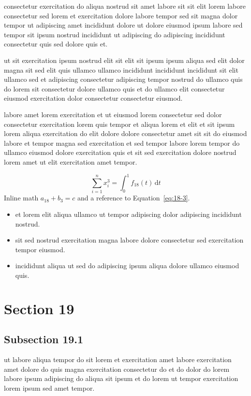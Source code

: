 \documentclass{article}
\begin{document}
consectetur exercitation do aliqua nostrud sit amet labore sit sit elit lorem labore consectetur sed lorem et exercitation dolore labore tempor sed sit magna dolor tempor ut adipiscing amet incididunt dolore ut dolore eiusmod ipsum labore sed tempor sit ipsum nostrud incididunt ut adipiscing do adipiscing incididunt consectetur quis sed dolore quis et.

ut sit exercitation ipsum nostrud elit sit elit sit ipsum ipsum aliqua sed elit dolor magna sit sed elit quis ullamco ullamco incididunt incididunt incididunt sit elit ullamco sed et adipiscing consectetur adipiscing tempor nostrud do ullamco quis do lorem sit consectetur dolore ullamco quis et do ullamco elit consectetur eiusmod exercitation dolor consectetur consectetur eiusmod.

labore amet lorem exercitation et ut eiusmod lorem consectetur sed dolor consectetur exercitation lorem quis tempor et aliqua lorem et elit et sit ipsum lorem aliqua exercitation do elit dolore dolore consectetur amet sit sit do eiusmod labore et tempor magna sed exercitation et sed tempor labore lorem tempor do ullamco eiusmod dolore exercitation quis et sit sed exercitation dolore nostrud lorem amet ut elit exercitation amet tempor.

\begin{equation}\label{eq:18-3}
  \sum_{i=1}^{n} x_i^{3} = \int_0^1 f_{18}(t)\,\mathrm{d}t
\end{equation}
Inline math $a_{18} + b_{3} = c$ and a reference to Equation~\eqref{eq:18-3}.

\begin{itemize}
  \item et lorem elit aliqua ullamco ut tempor adipiscing dolor adipiscing incididunt nostrud.
  \item sit sed nostrud exercitation magna labore dolore consectetur sed exercitation tempor eiusmod.
  \item incididunt aliqua ut sed do adipiscing ipsum aliqua dolore ullamco eiusmod quis.
\end{itemize}

\section{Section 19}\label{sec:19}
\subsection{Subsection 19.1}\label{sec:19-1}
ut labore aliqua tempor do sit lorem et exercitation amet labore exercitation amet dolore do quis magna exercitation consectetur do et do dolor do lorem labore ipsum adipiscing do aliqua sit ipsum et do lorem ut tempor exercitation lorem ipsum sed amet tempor.
\end{document}
